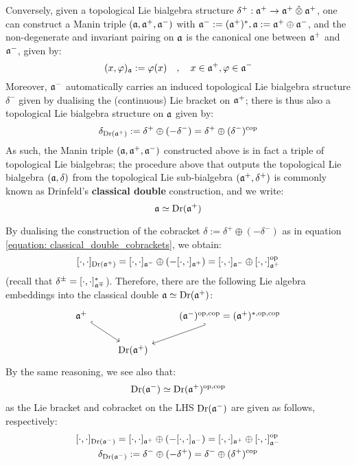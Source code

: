 Conversely, given a topological Lie bialgebra structure $\delta^+: \a^+ \to \a^+ \hattensor \a^+$, one can construct a Manin triple $(\mathfrak{a}, \mathfrak{a}^+, \mathfrak{a}^-)$ with $\mathfrak{a}^- := (\mathfrak{a}^+)^*, \mathfrak{a} := \mathfrak{a}^+ \oplus \mathfrak{a}^-$, and the non-degenerate and invariant pairing on $\mathfrak{a}$ is the canonical one between $\mathfrak{a}^+$ and $\mathfrak{a}^-$, given by:
    $$(x, \varphi)_{\mathfrak{a}} := \varphi(x) \quad, \quad x \in \mathfrak{a}^+, \varphi \in \mathfrak{a}^-$$
Moreover, $\mathfrak{a}^-$ automatically carries an induced topological Lie bialgebra structure $\delta^-$ given by dualising the (continuous) Lie bracket on $\mathfrak{a}^+$; there is thus also a topological Lie bialgebra structure on $\mathfrak{a}$ given by:
    \begin{equation} \label{equation: classical_double_cobrackets}
        \delta_{\operatorname{Dr}(\mathfrak{a}^+)} := \delta^+ \oplus (-\delta^-) = \delta^+ \oplus (\delta^-)^{\mathrm{cop}}
    \end{equation}
As such, the Manin triple $(\mathfrak{a}, \mathfrak{a}^+, \mathfrak{a}^-)$ constructed above is in fact a triple of topological Lie bialgebras; the procedure above that outputs the topological Lie bialgebra $(\mathfrak{a}, \delta)$ from the topological Lie sub-bialgebra $(\mathfrak{a}^+, \delta^+)$ is commonly known as Drinfeld's \textbf{classical double} construction, and we write:
    $$\mathfrak{a} \simeq \operatorname{Dr}(\mathfrak{a}^+)$$
\begin{remark} \label{remark: embeddings_into_classical_doubles}
    By dualising the construction of the cobracket $\delta := \delta^+ \oplus (-\delta^-)$ as in equation \eqref{equation: classical_double_cobrackets}, we obtain:
        $$[\cdot, \cdot]_{\operatorname{Dr}(\mathfrak{a}^+)} = [\cdot, \cdot]_{\mathfrak{a}^-} \oplus ( -[\cdot, \cdot]_{\mathfrak{a}^+} ) = [\cdot, \cdot]_{\mathfrak{a}^-} \oplus [\cdot, \cdot]_{\mathfrak{a}^+}^{\mathrm{op}}$$
    (recall that $\delta^{\pm} = [\cdot, \cdot]_{\mathfrak{a}^{\mp}}^*$). Therefore, there are the following Lie algebra embeddings into the classical double $\mathfrak{a} \simeq \operatorname{Dr}(\mathfrak{a}^+)$:
        \begin{equation} \label{diagram: embeddings_into_classical_doubles}
            \begin{tikzcd}
            	{\a^+} && {(\a^-)^{\op, \cop} = (\a^+)^{*, \op, \cop}} \\
            	& {\Dr(\a^+)}
            	\arrow[hook, from=1-1, to=2-2]
            	\arrow[hook', from=1-3, to=2-2]
            \end{tikzcd}
        \end{equation}
    By the same reasoning, we see also that:
        $$\operatorname{Dr}(\mathfrak{a}^-) \simeq \operatorname{Dr}(\mathfrak{a}^+)^{\mathrm{op}, \mathrm{cop}}$$
    as the Lie bracket and cobracket on the LHS $\operatorname{Dr}(\mathfrak{a}^-)$ are given as follows, respectively:
        $$
            \begin{gathered}
                [\cdot, \cdot]_{\Dr(\a^-)} = [\cdot, \cdot]_{\a^+} \oplus ( -[\cdot, \cdot]_{\a^-} ) = [\cdot, \cdot]_{\a^+} \oplus [\cdot, \cdot]_{\a^-}^{\op}
                \\
                \delta_{\Dr(\a^-)} := \delta^- \oplus (-\delta^+) = \delta^- \oplus (\delta^+)^{\cop}
            \end{gathered}
        $$
\end{remark}

